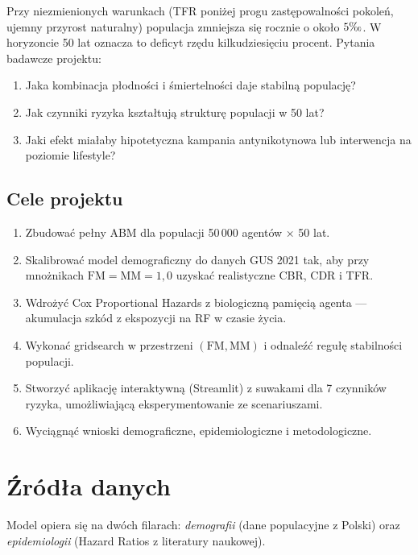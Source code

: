 \documentclass[11pt,a4paper]{article}
\newcommand{\promile}{\ensuremath{\text{\textperthousand}}}
\begin{document}
Przy niezmienionych warunkach (TFR poniżej progu zastępowalności pokoleń, ujemny przyrost naturalny) populacja zmniejsza się rocznie o około $5\promile$. W horyzoncie 50 lat oznacza to deficyt rzędu kilkudziesięciu procent. Pytania badawcze projektu:

\begin{enumerate}[leftmargin=*]
  \item Jaka kombinacja płodności i śmiertelności daje stabilną populację?
  \item Jak czynniki ryzyka kształtują strukturę populacji w 50 lat?
  \item Jaki efekt miałaby hipotetyczna kampania antynikotynowa lub interwencja na poziomie lifestyle?
\end{enumerate}

\subsection{Cele projektu}

\begin{enumerate}[leftmargin=*, itemsep=2pt]
  \item Zbudować pełny ABM dla populacji 50\,000 agentów × 50 lat.
  \item Skalibrować model demograficzny do danych GUS 2021 tak, aby przy mnożnikach $\mathrm{FM} = \mathrm{MM} = 1{,}0$ uzyskać realistyczne CBR, CDR i TFR.
  \item Wdrożyć Cox Proportional Hazards z biologiczną pamięcią agenta --- akumulacja szkód z ekspozycji na RF w czasie życia.
  \item Wykonać gridsearch w przestrzeni $(\mathrm{FM}, \mathrm{MM})$ i odnaleźć regułę stabilności populacji.
  \item Stworzyć aplikację interaktywną (Streamlit) z suwakami dla 7 czynników ryzyka, umożliwiającą eksperymentowanie ze scenariuszami.
  \item Wyciągnąć wnioski demograficzne, epidemiologiczne i metodologiczne.
\end{enumerate}

\newpage
\section{Źródła danych}

Model opiera się na dwóch filarach: \emph{demografii} (dane populacyjne z Polski) oraz \emph{epidemiologii} (Hazard Ratios z literatury naukowej).
\end{document}
